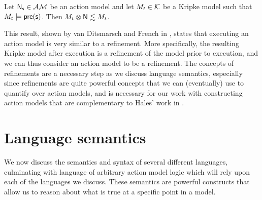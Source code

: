\begin{lemma} \label{eventModelsRefine}
Let $\mathrm{\mathsf{\mathrm{\mathsf{N}}_s}} \in \mathcal{AM}$ be an action model and let $M_t \in \mathcal{K}$ be a Kripke
model such that $M_t \models \mathrm{\mathsf{pre(s)}}$.
Then $M_t \otimes \mathrm{\mathsf{\mathrm{\mathsf{N}}}} \lesssim M_t$.
\end{lemma}

This result, shown by van Ditsmarsch and French in \cite{van2009simulation}, states that executing
an action model is very similar to a refinement.
More specifically, the resulting Kripke model after execution is a refinement of the model prior to
execution, and we can thus consider an action model to be a refinement.
The concepts of refinements are a necessary step as we discuss language semantics, especially since
refinements are quite powerful concepts that we can (eventually) use to quantify over action models,
and is necessary for our work with constructing action models that are complementary to Hales' work
in \cite{hales13synthesis}.

%
%
%
%
%

\section{Language semantics} \label{subsec:prelim:semantics}
We now discuss the semantics and syntax of several different languages, culminating with language of
arbitrary action model logic which will rely upon each of the languages we discuss.
These semantics are powerful constructs that allow us to reason about what is true at a specific
point in a model.

